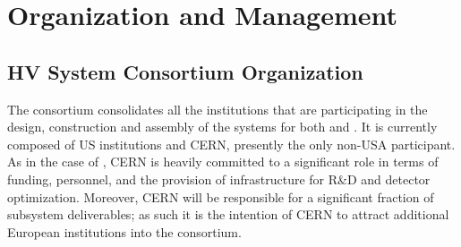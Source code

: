 


\section{Organization and Management}
\label{sec:fdsp-hv-org}


\subsection{HV System Consortium Organization}
\label{sec:fdsp-hv-org-consortium}

The consortium consolidates all the institutions that are participating in the design, construction and assembly of the  systems for both   and . It is currently composed of US institutions and CERN, presently the only non-USA participant. As in the case of , CERN is heavily committed to a significant role in terms of funding, personnel, 
 and the provision of infrastructure for R\&D and detector optimization. Moreover, CERN will be responsible for a significant fraction of subsystem deliverables; as such it is the intention of CERN to attract additional European institutions into the consortium.





